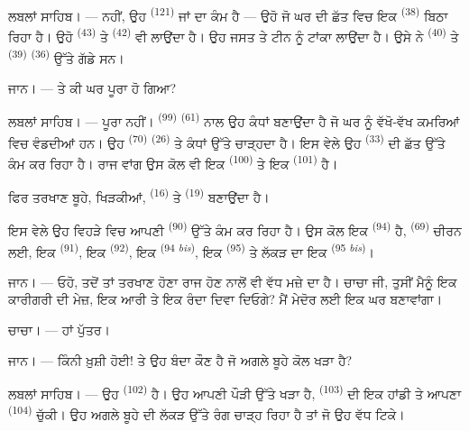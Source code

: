\textsc{ਲਬਲਾਂ ਸਾਹਿਬ}। --- ਨਹੀਂ, ਉਹ  \textsuperscript{(121)} ਜਾਂ
 ਦਾ ਕੰਮ ਹੈ — ਉਹੋ ਜੋ ਘਰ ਦੀ ਛੱਤ ਵਿਚ ਇਕ 
\textsuperscript{(38)} ਬਿਠਾ ਰਿਹਾ ਹੈ। ਉਹੋ 
\textsuperscript{(43)} ਤੇ  \textsuperscript{(42)} ਵੀ
ਲਾਉਂਦਾ ਹੈ। ਉਹ ਜਸਤ ਤੇ ਟੀਨ ਨੂੰ ਟਾਂਕਾ ਲਾਉਂਦਾ ਹੈ। ਉਸੇ ਨੇ 
\textsuperscript{(40)} ਤੇ  \textsuperscript{(39)}
 \textsuperscript{(36)} ਉੱਤੇ ਗੱਡੇ ਸਨ।

\textsc{ਜਾਨ}। --- ਤੇ ਕੀ ਘਰ ਪੂਰਾ ਹੋ ਗਿਆ?

\VUsaut{3.0mm}
\VUsaut{3.0mm}

\textsc{ਲਬਲਾਂ ਸਾਹਿਬ}। --- ਪੂਰਾ ਨਹੀਂ। 
\textsuperscript{(99)}  \textsuperscript{(61)} ਨਾਲ ਉਹ ਕੰਧਾਂ ਬਣਾਉਂਦਾ
ਹੈ ਜੋ ਘਰ ਨੂੰ ਵੱਖੋ-ਵੱਖ ਕਮਰਿਆਂ ਵਿਚ ਵੰਡਦੀਆਂ ਹਨ। ਉਹ 
\textsuperscript{(70)}  \textsuperscript{(26)} ਤੇ ਕੰਧਾਂ ਉੱਤੇ ਚਾੜ੍ਹਦਾ
ਹੈ। ਇਸ ਵੇਲੇ ਉਹ  \textsuperscript{(33)} ਦੀ ਛੱਤ ਉੱਤੇ ਕੰਮ ਕਰ ਰਿਹਾ ਹੈ।
ਰਾਜ ਵਾਂਗ ਉਸ ਕੋਲ ਵੀ ਇਕ  \textsuperscript{(100)} ਤੇ ਇਕ 
\textsuperscript{(101)} ਹੈ।

ਫਿਰ ਤਰਖਾਣ ਬੂਹੇ, ਖਿੜਕੀਆਂ,  \textsuperscript{(16)} ਤੇ
 \textsuperscript{(19)} ਬਣਾਉਂਦਾ ਹੈ।

ਇਸ ਵੇਲੇ ਉਹ ਵਿਹੜੇ ਵਿਚ ਆਪਣੀ  \textsuperscript{(90)} ਉੱਤੇ
ਕੰਮ ਕਰ ਰਿਹਾ ਹੈ। ਉਸ ਕੋਲ ਇਕ  \textsuperscript{(94)} ਹੈ, 
\textsuperscript{(69)} ਚੀਰਨ ਲਈ, ਇਕ  \textsuperscript{(91)}, ਇਕ
 \textsuperscript{(92)}, ਇਕ 
\textsuperscript{(94 \textit{bis})}, ਇਕ  \textsuperscript{(95)} ਤੇ
ਲੱਕੜ ਦਾ ਇਕ  \textsuperscript{(95 \textit{bis})}।

\textsc{ਜਾਨ}। --- ਓਹੋ, ਤਦੋਂ ਤਾਂ ਤਰਖਾਣ ਹੋਣਾ ਰਾਜ ਹੋਣ ਨਾਲੋਂ ਵੀ ਵੱਧ ਮਜ਼ੇ ਦਾ ਹੈ।
ਚਾਚਾ ਜੀ, ਤੁਸੀਂ ਮੈਨੂੰ ਇਕ ਕਾਰੀਗਰੀ ਦੀ ਮੇਜ਼, ਇਕ ਆਰੀ ਤੇ ਇਕ ਰੰਦਾ ਦਿਵਾ ਦਿਓਗੇ? ਮੈਂ
ਮੇਦੋਰ ਲਈ ਇਕ ਘਰ ਬਣਾਵਾਂਗਾ।

\textsc{ਚਾਚਾ}। --- ਹਾਂ ਪੁੱਤਰ।

\textsc{ਜਾਨ}। --- ਕਿੰਨੀ ਖ਼ੁਸ਼ੀ ਹੋਈ! ਤੇ ਉਹ ਬੰਦਾ ਕੌਣ ਹੈ ਜੋ ਅਗਲੇ ਬੂਹੇ ਕੋਲ ਖੜਾ ਹੈ?

\VUsaut{3.0mm}
\VUsaut{3.0mm}

\textsc{ਲਬਲਾਂ ਸਾਹਿਬ}। --- ਉਹ  \textsuperscript{(102)} ਹੈ। ਉਹ ਆਪਣੀ
ਪੌੜੀ ਉੱਤੇ ਖੜਾ ਹੈ,  \textsuperscript{(103)} ਦੀ ਇਕ ਹਾਂਡੀ ਤੇ ਆਪਣਾ
 \textsuperscript{(104)} ਚੁੱਕੀ। ਉਹ ਅਗਲੇ ਬੂਹੇ ਦੀ ਲੱਕੜ ਉੱਤੇ ਰੰਗ ਚਾੜ੍ਹ
ਰਿਹਾ ਹੈ ਤਾਂ ਜੋ ਉਹ ਵੱਧ ਟਿਕੇ।

